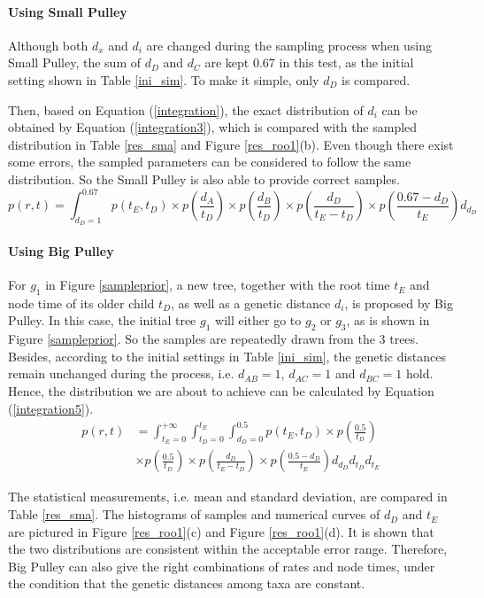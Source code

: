 \documentclass{bmcart}
\begin{document}
\begin{backmatter}
\paragraph*{Using Small Pulley}

Although both ${d_x}$ and ${d_i}$ are changed during the sampling process when using Small Pulley, the sum of ${d_D}$ and ${d_C}$ are kept 0.67 in this test, as the initial setting shown in Table \ref{ini_sim}. To make it simple, only ${d_D}$ is compared.

Then, based on Equation (\ref{integration}), the exact distribution of ${d_i}$ can be obtained by Equation (\ref{integration3}), which is compared with the sampled distribution in Table \ref{res_sma} and Figure \ref{res_roo1}(b). Even though there exist some errors, the sampled parameters can be considered to follow the same distribution. So the Small Pulley is also able to provide correct samples.
\begin{equation}\label{integration3}
p(r,t) = \int_{{d_D} = 1}^{0.67} {p({t_E},{t_D}) \times p(\frac{{{d_A}}}{{{t_D}}}) \times p(\frac{{{d_B}}}{{{t_D}}}) \times p(\frac{{{d_D}}}{{{t_E} - {t_D}}}) \times p(\frac{{0.67 - {d_D}}}{{{t_E}}}){d_{d_D}}}
\end{equation}

\paragraph*{Using Big Pulley}

For $g_1$ in Figure \ref{sampleprior}, a new tree, together with the root time $t_E$ and node time of its older child $t_D$, as well as a genetic distance $d_i$, is proposed by Big Pulley. In this case, the initial tree $g_1$ will either go to $g_2$ or $g_3$, as is shown in Figure \ref{sampleprior}.  So the samples are repeatedly drawn from the 3 trees. Besides, according to the initial settings in Table \ref{ini_sim}, the genetic distances remain unchanged during the process, i.e. $d_{AB} = 1$, $d_{AC}  = 1$ and $d_{BC} = 1$ hold. Hence, the distribution we are about to achieve can be calculated by Equation (\ref{integration5}).
\begin{equation}\label{integration5}
\begin{aligned}
p(r,t) &= \int_{{t_E} = 0}^{ + \infty } {\int_{{t_D} = 0}^{{t_E}} {\int_{{d_D} = 0}^{0.5} {p({t_E},{t_D})} } \times p(\frac{{0.5}}{{{t_D}}})}  \\&\times p(\frac{{0.5}}{{{t_D}}}) \times p(\frac{{{d_D}}}{{{t_E} - {t_D}}}) \times p(\frac{{0.5 - {d_D}}}{{{t_E}}}){d_{d_D}}{d_{t_D}}{d_{t_E}}
\end{aligned}
\end{equation}

The statistical measurements, i.e. mean and standard deviation, are compared in Table \ref{res_sma}. The histograms of samples and numerical curves of ${d_D}$ and ${t_E}$ are pictured in Figure \ref{res_roo1}(c) and Figure \ref{res_roo1}(d). It is shown that the two distributions are consistent within the acceptable error range. Therefore, Big Pulley can also give the right combinations of rates and node times, under the condition that the genetic distances among taxa are constant.

\end{backmatter}
\end{document}
